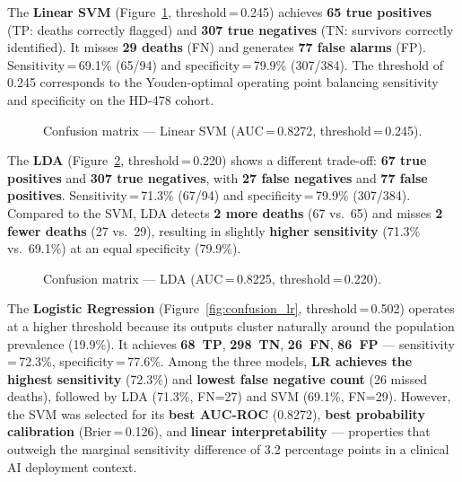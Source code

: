 \documentclass[12pt,a4paper,twoside]{report}
\begin{document}
The \textbf{Linear SVM} (Figure~\ref{fig:confusion_svm}, threshold\,=\,0.245) achieves \textbf{65 true positives} (TP: deaths correctly flagged) and \textbf{307 true negatives} (TN: survivors correctly identified). It misses \textbf{29 deaths} (FN) and generates \textbf{77 false alarms} (FP). Sensitivity\,=\,69.1\% (65/94) and specificity\,=\,79.9\% (307/384). The threshold of 0.245 corresponds to the Youden-optimal operating point balancing sensitivity and specificity on the HD-478 cohort.

\begin{figure}[htbp]
\centering
{}
\caption{Confusion matrix --- Linear SVM (AUC\,=\,0.8272, threshold\,=\,0.245).}
\label{fig:confusion_svm}
\end{figure}

\FloatBarrier
The \textbf{LDA} (Figure~\ref{fig:confusion_lda}, threshold\,=\,0.220) shows a different trade-off: \textbf{67 true positives} and \textbf{307 true negatives}, with \textbf{27 false negatives} and \textbf{77 false positives}. Sensitivity\,=\,71.3\% (67/94) and specificity\,=\,79.9\% (307/384). Compared to the SVM, LDA detects \textbf{2 more deaths} (67 vs.\ 65) and misses \textbf{2 fewer deaths} (27 vs.\ 29), resulting in slightly \textbf{higher sensitivity} (71.3\% vs.\ 69.1\%) at an equal specificity (79.9\%).

\begin{figure}[htbp]
\centering
{}
\caption{Confusion matrix --- LDA (AUC\,=\,0.8225, threshold\,=\,0.220).}
\label{fig:confusion_lda}
\end{figure}

\FloatBarrier
The \textbf{Logistic Regression} (Figure~\ref{fig:confusion_lr}, threshold\,=\,0.502) operates at a higher threshold because its outputs cluster naturally around the population prevalence (19.9\%). It achieves \textbf{68~TP}, \textbf{298~TN}, \textbf{26~FN}, \textbf{86~FP} --- sensitivity\,=\,72.3\%, specificity\,=\,77.6\%. Among the three models, \textbf{LR achieves the highest sensitivity} (72.3\%) and \textbf{lowest false negative count} (26 missed deaths), followed by LDA (71.3\%, FN=27) and SVM (69.1\%, FN=29). However, the SVM was selected for its \textbf{best AUC-ROC} (0.8272), \textbf{best probability calibration} (Brier\,=\,0.126), and \textbf{linear interpretability} --- properties that outweigh the marginal sensitivity difference of 3.2 percentage points in a clinical AI deployment context.
\end{document}
